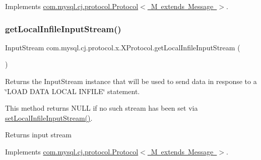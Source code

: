 Implements \mbox{\hyperlink{interfacecom_1_1mysql_1_1cj_1_1protocol_1_1_protocol_a62fc4a0bb330ef36eb91217c33b36ab8}{com.\+mysql.\+cj.\+protocol.\+Protocol$<$ M extends Message $>$}}.

\mbox{\label{classcom_1_1mysql_1_1cj_1_1protocol_1_1x_1_1_x_protocol_a5a291c17d84fa71984b3a65ecbb91315}} 
\subsubsection{\texorpdfstring{get\+Local\+Infile\+Input\+Stream()}{getLocalInfileInputStream()}}
{\footnotesize\ttfamily Input\+Stream com.\+mysql.\+cj.\+protocol.\+x.\+X\+Protocol.\+get\+Local\+Infile\+Input\+Stream (\begin{DoxyParamCaption}{ }\end{DoxyParamCaption})}

Returns the Input\+Stream instance that will be used to send data in response to a \char`\"{}\+L\+O\+A\+D D\+A\+T\+A L\+O\+C\+A\+L I\+N\+F\+I\+L\+E\char`\"{} statement.

This method returns N\+U\+LL if no such stream has been set via \mbox{\hyperlink{classcom_1_1mysql_1_1cj_1_1protocol_1_1x_1_1_x_protocol_a4f539adc72747ef03c94bc92acde5efb}{set\+Local\+Infile\+Input\+Stream()}}.

\begin{DoxyReturn}{Returns}
input stream 
\end{DoxyReturn}


Implements \mbox{\hyperlink{interfacecom_1_1mysql_1_1cj_1_1protocol_1_1_protocol_a14849c71b76edabc8dae60d7c22d9fee}{com.\+mysql.\+cj.\+protocol.\+Protocol$<$ M extends Message $>$}}.

\mbox{\label{classcom_1_1mysql_1_1cj_1_1protocol_1_1x_1_1_x_protocol_aa6abdec32fdb1e18c44c33b831b40e20}} 

